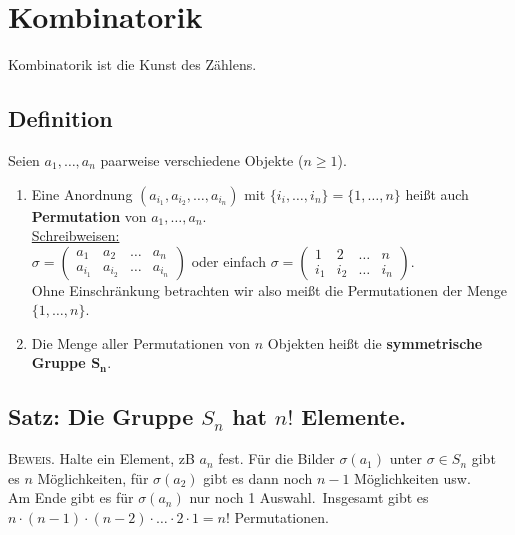 \section{Kombinatorik}

Kombinatorik ist die Kunst des Zählens.


\subsection{Definition}

	Seien $a_1,\dots,a_n$ paarweise verschiedene Objekte ($n\geq 1$).
	
	\begin{enumerate}
	\item Eine Anordnung $(a_{i_1},a_{i_2},\dots,a_{i_n})$ mit $\{ i_i,\dots, i_n \}=\{ 1,\dots,n \}$ heißt auch
	\textbf{Permutation} von $a_1,\dots,a_n$.\\ \newline
	\underline{Schreibweisen:}\\ \newline 
	$\sigma=\left(\begin{array}{cccc}
   				a_1		& a_2		& \dots & a_n\\
        		a_{i_1}	& a_{i_2}	& \dots & a_{i_n}
            \end{array}\right)$ oder einfach
   	$\sigma=\left(\begin{array}{cccc}
                1	& 2		& \dots & n\\
                i_1	& i_2	& \dots & i_n
            \end{array}\right)$.\\ \newline
	Ohne Einschränkung betrachten wir also meißt die Permutationen der Menge $\{1,\dots,n\}$.
	\item Die Menge aller Permutationen von $n$ Objekten heißt die \textbf{symmetrische Gruppe $\mathbf{S_n}$}.
	\end{enumerate}
	
	
\subsection{Satz: Die Gruppe $S_n$ hat $n!$ Elemente.}

	\textsc{Beweis.} Halte ein Element, zB $a_n$ fest. Für die Bilder $\sigma(a_1)$ unter $\sigma\in S_n$ gibt
	es $n$ Möglichkeiten, für $\sigma(a_2)$ gibt es dann noch $n-1$ Möglichkeiten usw.\\
	Am Ende gibt es für $\sigma(a_n)$ nur noch 1 Auswahl.\
	Insgesamt gibt es $n\cdot (n-1)\cdot (n-2)\cdot \ldots \cdot 2 \cdot 1 = n!$ Permutationen. 
	
